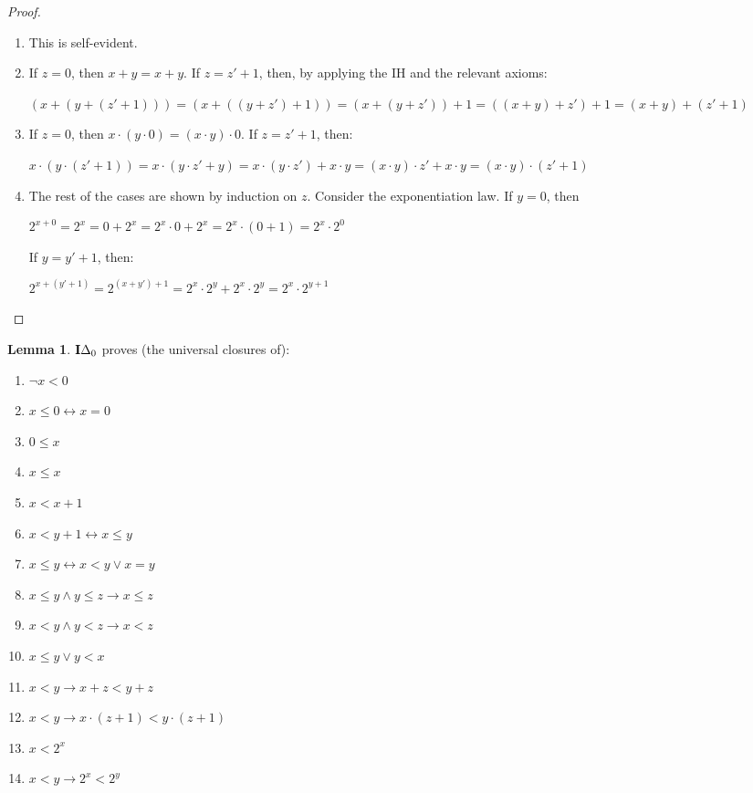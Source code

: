 \documentclass[8pt]{article}
\theoremstyle{definition}
\theoremstyle{definition}
\theoremstyle{definition}
\theoremstyle{definition}
\theoremstyle{definition}
\theoremstyle{definition}
\theoremstyle{definition}
\theoremstyle{definition}
\newtheorem{lemma}{Lemma}[section]
\theoremstyle{definition}
\theoremstyle{definition}
\theoremstyle{definition}
\theoremstyle{definition}
\theoremstyle{definition}
\theoremstyle{question}
\begin{document}
\begin{proof}
$ $

  \begin{enumerate}
    \item This is self-evident.
    \item If $z = 0$, then $x + y = x + y$. If $z = z' + 1$, then, by applying the IH and the relevant axioms:
    \begin{center}
      $(x + (y + (z' + 1))) = (x + ((y + z') + 1)) = (x + (y + z')) + 1 = ((x + y) + z') + 1 = (x + y) + (z' + 1)$
    \end{center}
    \item If $z = 0$, then $x \cdot (y \cdot 0) = (x \cdot y) \cdot 0$. If $z = z' + 1$, then:
    \begin{center}
    $x \cdot (y \cdot (z' + 1)) = x \cdot (y \cdot z' + y) = x \cdot (y \cdot z') + x \cdot y =
    (x \cdot y) \cdot z' + x \cdot y = (x \cdot y) \cdot (z' + 1)$
    \end{center}
    \item The rest of the cases are shown by induction on $z$. Consider the exponentiation law.
    If $y = 0$, then

    \begin{center}
    $2^{x + 0} = 2^{x} = 0 + 2^{x} = 2^{x} \cdot 0 + 2^{x} = 2^{x} \cdot (0 + 1) = 2^x \cdot 2^0$
    \end{center}

    If $y = y' + 1$, then:
    \begin{center}
      $2^{x + (y' + 1)} = 2^{(x + y') + 1} = 2^x \cdot 2^y + 2^x \cdot 2^y = 2^{x} \cdot 2^{y + 1}$
    \end{center}
  \end{enumerate}
\end{proof}

\begin{lemma}
  ${\bf I}\Delta_0$ proves (the universal closures of):

  \begin{enumerate}
    \item $\neg x < 0$
    \item $x \leq 0 \leftrightarrow x = 0$
    \item $0 \leq x$
    \item $x \leq x$
    \item $x < x + 1$
    \item $x < y + 1 \leftrightarrow x \leq y$
    \item $x \leq y \leftrightarrow x < y \lor x = y$ 
    \item $x \leq y \land y \leq z \to x \leq z$
    \item $x < y \land y < z \to x < z$
    \item $x \leq y \lor y < x$
    \item $x < y \to x + z < y + z$
    \item $x < y \to x \cdot (z + 1) < y \cdot (z + 1)$
    \item $x < 2^x$
    \item $x < y \to 2^x < 2^y$
  \end{enumerate}
\end{lemma}
\end{document}
